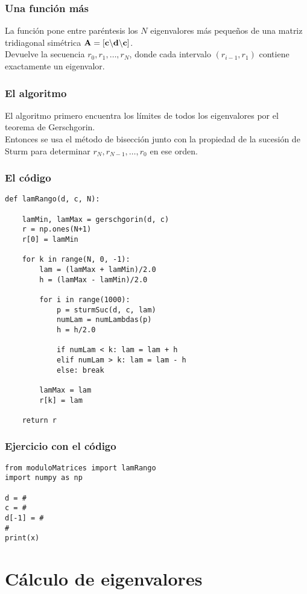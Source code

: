 \documentclass[12pt]{beamer}
\begin{document}
\begin{frame}
\frametitle{Una función más}
La función  pone entre paréntesis los $N$ eigenvalores más pequeños de una matriz tridiagonal simétrica $\vb{A} = [ \vb{c} \backslash \vb{d} \backslash \vb{c}]$.
\\
\bigskip
\pause
Devuelve la secuencia $r_{0}, r_{1}, \ldots, r_{N}$, donde cada intervalo $(r_{i-1}, r_{1})$ contiene exactamente un eigenvalor.
\end{frame}
\begin{frame}
\frametitle{El algoritmo}
El algoritmo primero encuentra los límites de todos los eigenvalores por el teorema de Gerschgorin.
\\
\bigskip
\pause
Entonces se usa el método de bisección junto con la propiedad de la sucesión de Sturm para determinar $r_{N}, r_{N-1}, \ldots, r_{0}$ en ese orden.
\end{frame}
\begin{frame}
\frametitle{El código}
\begin{lstlisting}[caption=Código para poner en paréntesis los eigenvalores]
def lamRango(d, c, N):
    
    lamMin, lamMax = gerschgorin(d, c)
    r = np.ones(N+1)
    r[0] = lamMin
    
    for k in range(N, 0, -1):
        lam = (lamMax + lamMin)/2.0
        h = (lamMax - lamMin)/2.0
        
        for i in range(1000):
            p = sturmSuc(d, c, lam)
            numLam = numLambdas(p)
            h = h/2.0
            
            if numLam < k: lam = lam + h
            elif numLam > k: lam = lam - h
            else: break
        
        lamMax = lam
        r[k] = lam
    
    return r
\end{lstlisting}
\end{frame}
\begin{frame}[fragile]
\frametitle{Ejercicio con el código}
\begin{lstlisting}[caption=Parte del código para resolver el ejercicio]
from moduloMatrices import lamRango
import numpy as np

d = #
c = #
d[-1] = #
#
print(x)
\end{lstlisting}
\end{frame}

\section{Cálculo de eigenvalores}
\end{document}
